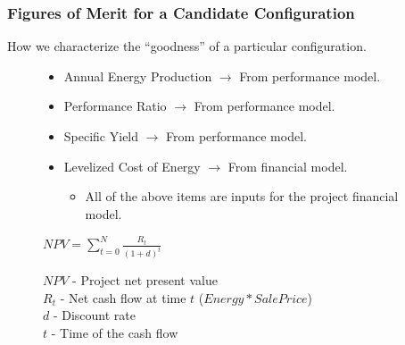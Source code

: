 \documentclass[aspectratio=169]{beamer}
\begin{document}
\begin{frame}
  \frametitle{Figures of Merit for a Candidate Configuration}
  How we characterize the ``goodness'' of a particular configuration.
  
  \begin{figure}

  \begin{itemize}
  \item Annual Energy Production $\rightarrow$ From performance model.
  \item Performance Ratio $\rightarrow$ From performance model.
  \item Specific Yield $\rightarrow$ From performance model.
  \item Levelized Cost of Energy $\rightarrow$ From financial model.
    \begin{itemize}
    \item All of the above items are inputs for the project financial model.
    \end{itemize}
  \end{itemize}
    
    \center
    $NPV=\displaystyle\sum\limits_{t=0}^N\frac{R_{t}}{(1+d)^t}$
  \end{figure}
  \begin{figure}
    \raggedright
    \scriptsize
    $NPV$ - Project net present value\\
    $R_{t}$ - Net cash flow at time $t$ ($Energy*Sale Price$)\\
    $d$ - Discount rate\\
    $t$ - Time of the cash flow
  \end{figure}
\end{frame}
\end{document}
